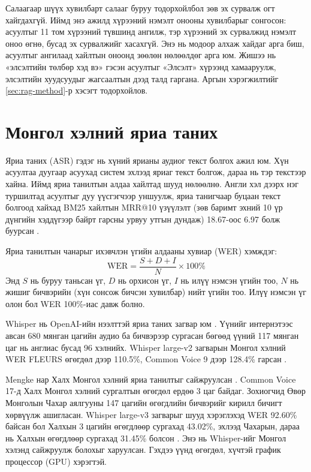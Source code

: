 Салаагаар шүүх хувилбарт салааг буруу тодорхойлбол зөв эх сурвалж огт хайгдахгүй. Иймд энэ ажилд хүрээний нэмэлт онооны хувилбарыг сонгосон: асуултыг 11 том хүрээний түвшинд ангилж, тэр хүрээний эх сурвалжид нэмэлт оноо өгнө, бусад эх сурвалжийг хасахгүй. Энэ нь модоор алхаж хайдаг арга биш, асуултыг ангилаад хайлтын оноонд зөөлөн нөлөөлдөг арга юм. Жишээ нь «элсэлтийн төлбөр хэд вэ» гэсэн асуултыг «Элсэлт» хүрээнд хамааруулж, элсэлтийн хуудсуудыг жагсаалтын дээд талд гаргана. Аргын хэрэгжилтийг \ref{sec:rag-method}-р хэсэгт тодорхойлов.

\section{Монгол хэлний яриа таних}
\label{sec:lit-asr}

Яриа таних (\acs{ASR}) гэдэг нь хүний ярианы аудиог текст болгох ажил юм. Хүн асуултаа дуугаар асуухад систем эхлээд яриаг текст болгож, дараа нь тэр текстээр хайна. Иймд яриа танилтын алдаа хайлтад шууд нөлөөлнө. Англи хэл дээрх нэг туршилтад асуултыг дуу үүсгэгчээр уншуулж, яриа танигчаар буцаан текст болгоод хайхад BM25 хайлтын MRR@10 үзүүлэлт (зөв баримт эхний 10 үр дүнгийн хэддүгээр байрт гарсны урвуу утгын дундаж) 18.67-оос 6.97 болж буурсан \cite{sidiropoulos2022asr}.

Яриа танилтын чанарыг ихэвчлэн үгийн алдааны хувиар (\acs{WER}) хэмждэг:
\begin{equation}
\mathrm{WER} = \frac{S + D + I}{N} \times 100\%
\label{eq:wer}
\end{equation}
Энд $S$ нь буруу таньсан үг, $D$ нь орхисон үг, $I$ нь илүү нэмсэн үгийн тоо, $N$ нь жишиг бичвэрийн (хүн сонсож бичсэн хувилбар) нийт үгийн тоо. Илүү нэмсэн үг олон бол WER 100\%-иас давж болно.

Whisper нь OpenAI-ийн нээлттэй яриа таних загвар юм \cite{radford2023whisper}. Үүнийг интернэтээс авсан 680 мянган цагийн аудио ба бичвэрээр сургасан бөгөөд үүний 117 мянган цаг нь англиас бусад 96 хэлнийх. Whisper large-v2 загварын Монгол хэлний WER FLEURS өгөгдөл дээр 110.5\%, Common Voice 9 дээр 128.4\% гарсан \cite{radford2023whisper}. %

Mengke нар Халх Монгол хэлний яриа танилтыг сайжруулсан \cite{mengke2025khalkha}. Common Voice 17-д Халх Монгол хэлний сургалтын өгөгдөл ердөө 3 цаг байдаг. Зохиогчид Өвөр Монголын Чахар аялгууны 147 цагийн өгөгдлийн бичвэрийг кирилл бичигт хөрвүүлж ашигласан. Whisper large-v3 загварыг шууд хэрэглэхэд WER 92.60\% байсан бол Халхын 3 цагийн өгөгдлөөр сургахад 43.02\%, эхлээд Чахарын, дараа нь Халхын өгөгдлөөр сургахад 31.45\% болсон \cite{mengke2025khalkha}. Энэ нь Whisper-ийг Монгол хэлэнд сайжруулж болохыг харуулсан. Гэхдээ үүнд өгөгдөл, хүчтэй график процессор (\acs{GPU}) хэрэгтэй.

